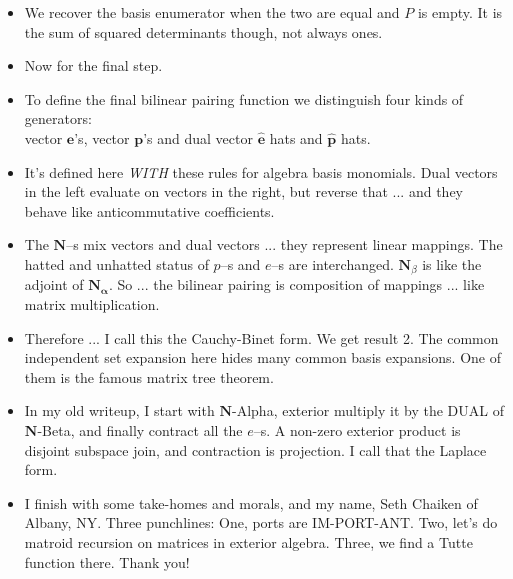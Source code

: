 \documentclass[14pt]{extarticle}
\begin{document}
{\begin{itemize}
\item
  We recover the basis enumerator when the two are equal and $P$ is empty.  It
  is the sum of squared determinants though, not always ones.

\item Now for the final step.

\item
  To define the final bilinear pairing function 
  we distinguish 
  four kinds of generators:\\
  vector $\mathbf{e}$'s, vector $\mathbf{p}$'s and
dual vector $\widehat{\mathbf{e}}$ hats and $\widehat{\mathbf{p}}$ hats.  

\item
  It's defined here \emph{WITH} these rules for algebra basis monomials.  Dual vectors
  in the left evaluate on vectors in the right, but reverse that ... and
  they behave like anticommutative coefficients.

\item
  The $\mathbf{N}$--s mix vectors and dual vectors ... they represent linear mappings.
  The hatted and unhatted status of $p$--s and $e$--s are interchanged.
  $\mathbf{N}_\beta$ is like the adjoint of $\mathbf{N_\alpha}$.  So ... the
  bilinear pairing is composition of mappings  ... like matrix multiplication.

\item
  Therefore ... I call this the Cauchy-Binet form.  We get result 2.  The common
  independent set expansion here hides many common basis expansions.  One of them
  is the famous matrix tree theorem.

\item
  In my old writeup, I start with $\mathbf{N}$-Alpha, exterior multiply it by the DUAL of
  $\mathbf{N}$-Beta,
  and finally contract all the $e$--s.  A non-zero exterior product is disjoint subspace join, and
  contraction is projection. I call that the Laplace form.  

\item
  I finish with some take-homes and morals, and my name, Seth Chaiken
  of Albany, NY.
  Three punchlines:  One, ports are IM-PORT-ANT.
  Two, let's do matroid recursion on matrices in exterior algebra.
  Three, we find a Tutte function there.
  Thank you!
  \end{itemize}
}
\end{document}
